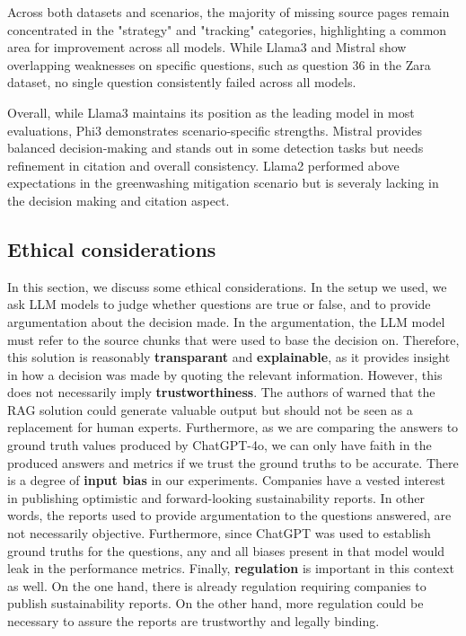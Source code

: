 \documentclass[]{article}
\begin{document}
Across both datasets and scenarios, the majority of missing source pages remain concentrated in the "strategy" and "tracking" categories, highlighting a common area for improvement across all models. 
While Llama3 and Mistral show overlapping weaknesses on specific questions, such as question 36 in the Zara dataset, no single question consistently failed across all models.

Overall, while Llama3 maintains its position as the leading model in most evaluations, Phi3 demonstrates scenario-specific strengths. 
Mistral provides balanced decision-making and stands out in some detection tasks but needs refinement in citation and overall consistency. 
Llama2 performed above expectations in the greenwashing mitigation scenario but is severaly lacking in the decision making and citation aspect.

\subsection{Ethical considerations}

In this section, we discuss some ethical considerations.
In the setup we used, we ask LLM models to judge whether questions are true or false, and to provide argumentation about the decision made.
In the argumentation, the LLM model must refer to the source chunks that were used to base the decision on.
Therefore, this solution is reasonably \textbf{transparant} and \textbf{explainable}, as it provides insight in how a decision was made by quoting the relevant information.
However, this does not necessarily imply \textbf{trustworthiness}.
The authors of \cite{durability} warned that the RAG solution could generate valuable output but should not be seen as a replacement for human experts.
Furthermore, as we are comparing the answers to ground truth values produced by ChatGPT-4o, we can only have faith in the produced answers and metrics if we trust the ground truths to be accurate.
There is a degree of \textbf{input bias} in our experiments.
Companies have a vested interest in publishing optimistic and forward-looking sustainability reports.
In other words, the reports used to provide argumentation to the questions answered, are not necessarily objective.
Furthermore, since ChatGPT was used to establish ground truths for the questions, any and all biases present in that model would leak in the performance metrics.
Finally, \textbf{regulation} is important in this context as well.
On the one hand, there is already regulation requiring companies to publish sustainability reports.
On the other hand, more regulation could be necessary to assure the reports are trustworthy and legally binding.
\end{document}
